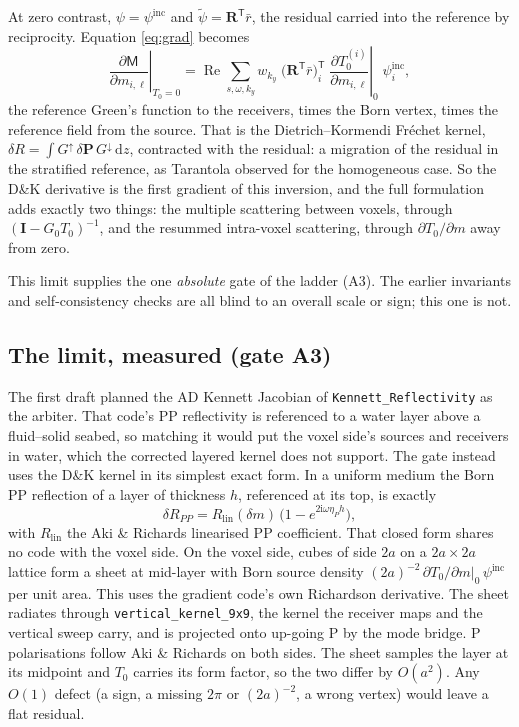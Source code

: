 \documentclass[11pt,a4paper]{article}
\newcommand{\ii}{\mathrm{i}}
\newcommand{\rd}{\mathrm{d}}
\newcommand{\Tz}{T_0}
\newcommand{\Gz}{G_0}
\newcommand{\bR}{\mathbf{R}}
\newcommand{\bI}{\mathbf{I}}
\newcommand{\T}{\mathsf{T}}
\begin{document}
At zero contrast, $\psi = \psi^{\mathrm{inc}}$ and $\tilde\psi = \bR^{\T}\bar r$, the residual carried
into the reference by reciprocity. Equation \eqref{eq:grad} becomes
\begin{equation}\label{eq:dkgrad}
  \left.\frac{\partial\mathsf{M}}{\partial m_{i,\ell}}\right|_{\Tz=0}
  = \operatorname{Re}\sum_{s,\omega,k_y} w_{k_y}\;
    \bigl(\bR^{\T}\bar r\bigr)_i^{\T}\;
    \left.\frac{\partial\Tz^{(i)}}{\partial m_{i,\ell}}\right|_0\;
    \psi^{\mathrm{inc}}_i ,
\end{equation}
the reference Green's function to the receivers, times the Born vertex, times the reference field
from the source. That is the Dietrich--Kormendi Fréchet kernel,
$\delta R = \int G^{\uparrow}\,\delta\mathbf{P}\,G^{\downarrow}\,\rd z$, contracted with the
residual: a migration of the residual in the stratified reference, as Tarantola observed for the
homogeneous case. So the D\&K derivative is the first gradient of this inversion, and the full
formulation adds exactly two things: the multiple scattering between voxels, through
$(\bI-\Gz\Tz)^{-1}$, and the resummed intra-voxel scattering, through $\partial\Tz/\partial m$
away from zero.

This limit supplies the one \emph{absolute} gate of the ladder (A3). The earlier invariants and
self-consistency checks are all blind to an overall scale or sign; this one is not.

\subsection{The limit, measured (gate A3)}\label{sec:a3}

The first draft planned the AD Kennett Jacobian of \nolinkurl{Kennett_Reflectivity} as the arbiter.
That code's PP reflectivity is referenced to a water layer above a fluid--solid seabed, so matching
it would put the voxel side's sources and receivers in water, which the corrected layered kernel
does not support. The gate instead uses the D\&K kernel in its simplest exact form. In a uniform
medium the Born PP reflection of a layer of thickness $h$, referenced at its top, is exactly
\begin{equation}\label{eq:bornlayer}
  \delta R_{PP} = R_{\mathrm{lin}}(\delta m)\,\bigl(1 - e^{2\ii\omega\eta_P h}\bigr),
\end{equation}
with $R_{\mathrm{lin}}$ the Aki \& Richards linearised PP coefficient. That closed form shares no code
with the voxel side. On the voxel side, cubes of side $2a$ on a $2a\times2a$ lattice form a sheet at
mid-layer with Born source density $(2a)^{-2}\,\partial\Tz/\partial m|_0\,\psi^{\mathrm{inc}}$ per unit
area. This uses the gradient code's own Richardson derivative. The sheet radiates through
\nolinkurl{vertical_kernel_9x9}, the kernel the receiver maps and the vertical sweep carry, and is
projected onto up-going P by the mode bridge. P polarisations follow Aki \& Richards on both
sides. The sheet samples the layer at its midpoint and $\Tz$ carries its form factor, so the two
differ by $O(a^2)$. Any $O(1)$ defect (a sign, a missing $2\pi$ or $(2a)^{-2}$, a wrong vertex) would
leave a flat residual.
\end{document}
